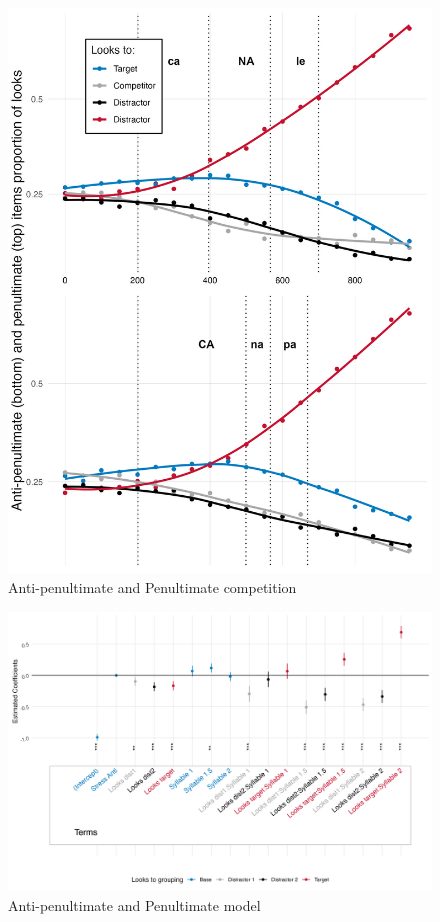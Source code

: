\begin{figure}[H]
  \centering
  \includegraphics[width=0.6\linewidth]{visuals/pen_vs_anti_pen.jpeg} %
  \caption{Anti-penultimate and Penultimate competition}
  \label{fig:raw_pen_vs_anti}
\end{figure}

\begin{figure}[H]
  \centering
  \includegraphics[width=1\linewidth]{visuals/pen_vs_anti_pen_model.jpeg} %
  \caption{Anti-penultimate and Penultimate model}
  \label{fig:model_pen_vs_anti}
\end{figure}